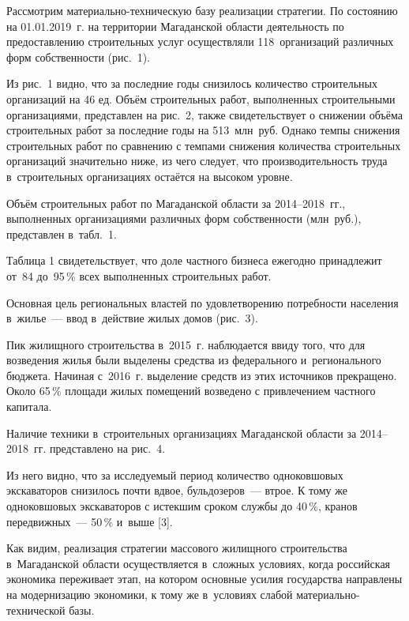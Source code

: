 Рассмотрим материально-техническую базу реализации стратегии. По состоянию на 01.01.2019~г. на территории Магаданской области деятельность по предоставлению строительных услуг осуществляли 118~организаций различных форм собственности (рис.~1).

Из рис.~1 видно, что за последние годы снизилось количество строительных организаций на 46 ед. Объём строительных работ, выполненных строительными организациями, представлен на рис.~2, также свидетельствует о снижении объёма строительных работ за последние годы на 513~млн~руб. Однако темпы снижения строительных работ по сравнению с темпами снижения количества строительных организаций значительно ниже, из чего следует, что производительность труда в~строительных организациях остаётся на высоком уровне.




Объём строительных работ по Магаданской области за 2014--2018~гг., выполненных организациями различных форм собственности (млн~руб.), представлен в~табл.~1.



Таблица 1 свидетельствует, что доле частного бизнеса ежегодно принадлежит от~84 до~95\,\% всех выполненных строительных работ.




\clearpage
Основная цель региональных властей по удовлетворению потребности населения в~жилье~--- ввод в~действие жилых домов (рис.~3).

Пик жилищного строительства в~2015~г. наблюдается ввиду того, что для возведения жилья были выделены средства из федерального и~регионального бюджета. Начиная с~2016~г. выделение средств из этих источников прекращено. Около 65\,\%  площади жилых помещений возведено с привлечением частного капитала.

Наличие техники в~строительных организациях Магаданской области за 2014--2018~гг. представлено на рис.~4.





Из него видно, что за исследуемый период количество одноковшовых экскаваторов снизилось почти вдвое, бульдозеров~--- втрое. К тому же одноковшовых экскаваторов с истекшим сроком службы до 40\,\%, кранов передвижных~--- 50\,\% и~выше [3].

\clearpage
Как видим, реализация стратегии массового жилищного строительства в~Магаданской области осуществляется в~сложных условиях, когда российская экономика переживает этап, на котором основные усилия государства направлены на модернизацию экономики, к тому же в~условиях слабой материально-технической базы.

